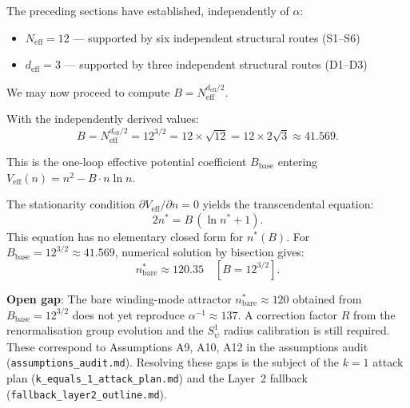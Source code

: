 \documentclass[12pt,a4paper]{article}
\theoremstyle{definition}
\theoremstyle{remark}
\begin{document}
\begin{tcolorbox}[colback=green!5!white,colframe=green!60!black,
                  title=Decision Gate: $N_{\mathrm{eff}}$ Established]
The preceding sections have established, independently of $\alpha$:
\begin{itemize}
  \item $N_{\mathrm{eff}} = 12$ — supported by six independent structural routes (S1–S6)
  \item $d_{\mathrm{eff}} = 3$ — supported by three independent structural routes (D1–D3)
\end{itemize}
We may now proceed to compute $B = N_{\mathrm{eff}}^{d_{\mathrm{eff}}/2}$.
\end{tcolorbox}

\medskip
With the independently derived values:
\begin{equation}
  \boxed{
    B = N_{\mathrm{eff}}^{d_{\mathrm{eff}}/2}
      = 12^{3/2}
      = 12 \times \sqrt{12}
      = 12 \times 2\sqrt{3}
      \approx 41.569.
  }
  \label{eq:B_base}
\end{equation}

This is the one-loop effective potential coefficient $B_{\mathrm{base}}$ entering
$V_{\mathrm{eff}}(n) = n^2 - B\cdot n\ln n$.

The stationarity condition $\partial V_{\mathrm{eff}}/\partial n = 0$ yields
the transcendental equation:
\begin{equation}
  2n^* = B\,(\ln n^* + 1).
  \label{eq:stationarity}
\end{equation}
This equation has no elementary closed form for $n^*(B)$.  For
$B_{\mathrm{base}} = 12^{3/2} \approx 41.569$, numerical solution by bisection
gives:
\begin{equation}
  n^*_{\mathrm{bare}} \approx 120.35 \quad [B = 12^{3/2}].
  \label{eq:nstar_raw}
\end{equation}

\begin{gapbox}
\textbf{Open gap}: The bare winding-mode attractor $n^*_{\mathrm{bare}} \approx 120$
obtained from $B_{\mathrm{base}} = 12^{3/2}$ does not yet reproduce
$\alpha^{-1} \approx 137$.  A correction factor $R$ from the renormalisation
group evolution and the $S^1_\psi$ radius calibration is still required.
These correspond to Assumptions A9, A10, A12 in the assumptions audit
(\texttt{assumptions\_audit.md}).  Resolving these gaps is the subject of the
$k=1$ attack plan (\texttt{k\_equals\_1\_attack\_plan.md}) and the Layer~2
fallback (\texttt{fallback\_layer2\_outline.md}).
\end{gapbox}
\end{document}
